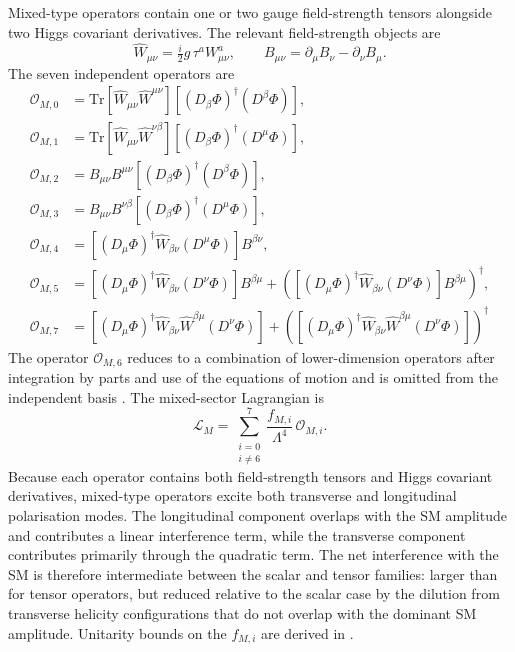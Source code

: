 Mixed-type operators contain one or two gauge field-strength tensors alongside two Higgs covariant derivatives. The relevant field-strength objects are
\begin{equation}
\hat{W}_{\mu\nu} = \tfrac{i}{2}g\,\tau^{a}W_{\mu\nu}^{a}, \qquad B_{\mu\nu} = \partial_{\mu}B_{\nu}-\partial_{\nu}B_{\mu}.
\end{equation}
The seven independent operators are \cite{Eboli_2016}
\begin{align}
\mathcal{O}_{M,0} &= \mathrm{Tr}\!\left[\hat{W}_{\mu\nu}\hat{W}^{\mu\nu}\right] \left[(D_{\beta}\Phi)^{\dagger}(D^{\beta}\Phi)\right], \\[3pt] \mathcal{O}_{M,1} &= \mathrm{Tr}\!\left[\hat{W}_{\mu\nu}\hat{W}^{\nu\beta}\right] \left[(D_{\beta}\Phi)^{\dagger}(D^{\mu}\Phi)\right], \\[3pt] \mathcal{O}_{M,2} &= B_{\mu\nu}B^{\mu\nu} \left[(D_{\beta}\Phi)^{\dagger}(D^{\beta}\Phi)\right], \\[3pt] \mathcal{O}_{M,3} &= B_{\mu\nu}B^{\nu\beta} \left[(D_{\beta}\Phi)^{\dagger}(D^{\mu}\Phi)\right], \\[3pt] \mathcal{O}_{M,4} &= \left[(D_{\mu}\Phi)^{\dagger}\hat{W}_{\beta\nu}(D^{\mu}\Phi)\right]B^{\beta\nu}, \\[3pt] \mathcal{O}_{M,5} &= \left[(D_{\mu}\Phi)^{\dagger}\hat{W}_{\beta\nu}(D^{\nu}\Phi)\right]B^{\beta\mu} + \left(\left[(D_{\mu}\Phi)^{\dagger}\hat{W}_{\beta\nu}(D^{\nu}\Phi)\right]B^{\beta\mu}\right)^{\dagger}, \\[3pt] \mathcal{O}_{M,7} &= \left[(D_{\mu}\Phi)^{\dagger}\hat{W}_{\beta\nu}\hat{W}^{\beta\mu}(D^{\nu}\Phi)\right] + \left(\left[(D_{\mu}\Phi)^{\dagger}\hat{W}_{\beta\nu}\hat{W}^{\beta\mu}(D^{\nu}\Phi)\right]\right)^{\dagger}
\end{align}
The operator $\mathcal{O}_{M,6}$ reduces to a combination of lower-dimension operators after integration by parts and use of the equations of motion and is omitted from the independent basis \cite{Eboli_2016}. The mixed-sector Lagrangian is
\begin{equation}
\mathcal{L}_{M} = \sum_{\substack{i=0\\i\neq 6}}^{7} \frac{f_{M,i}}{\Lambda^{4}}\,\mathcal{O}_{M,i}.
\end{equation}
Because each operator contains both field-strength tensors and Higgs covariant derivatives, mixed-type operators excite both transverse and longitudinal polarisation modes. The longitudinal component overlaps with the SM amplitude and contributes a linear interference term, while the transverse component contributes primarily through the quadratic term. The net interference with the SM is therefore intermediate between the scalar and tensor families: larger than for tensor operators, but reduced relative to the scalar case by the dilution from transverse helicity configurations that do not overlap with the dominant SM amplitude. Unitarity bounds on the $f_{M,i}$ are derived in \cite{PhysRevD.101.113003}.

